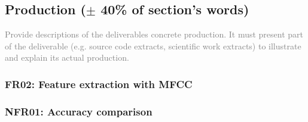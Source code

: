 \subsection{Production ($\pm$ 40\% of section's words)}
\textcolor{gray}{Provide descriptions of the deliverables concrete production.
It must present part of the deliverable (e.g. source code extracts, scientific
work extracts) to illustrate and explain its actual production.}

\subsubsection{FR02: Feature extraction with MFCC}

\subsubsection{NFR01: Accuracy comparison}
